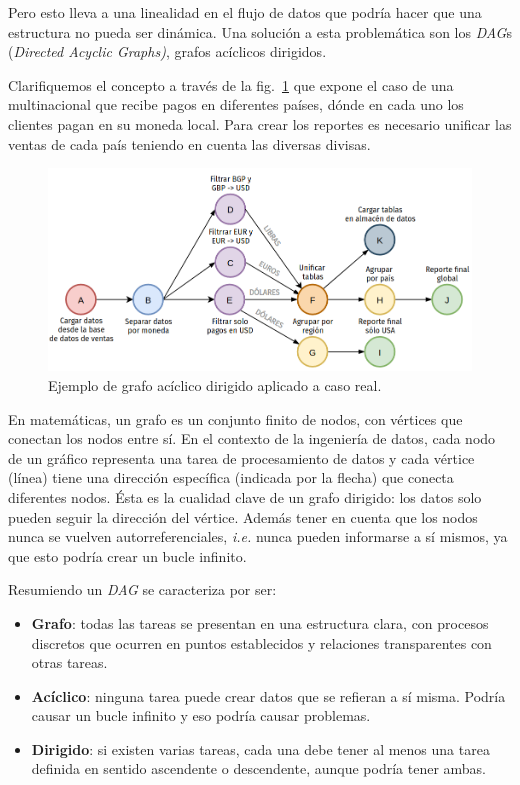 \documentclass[a4paper,12pt]{article}
\begin{document}
		Pero esto lleva a una linealidad en el flujo de datos que podría hacer que una estructura no pueda ser dinámica. Una solución a esta problemática son los \textit{DAG}s (\textit{Directed Acyclic Graphs)}, grafos acíclicos dirigidos.
				
		Clarifiquemos el concepto a través de la fig.~\ref{fig:dag} que expone el caso de una multinacional que recibe pagos en diferentes países, dónde en cada uno los clientes pagan en su moneda local. Para crear los reportes es necesario unificar las ventas de cada país teniendo en cuenta las diversas divisas.
				
		\begin{figure}[H]
			\begin{center}				
				\includegraphics[width=1\textwidth]{dag.png}
				\caption{Ejemplo de grafo acíclico dirigido aplicado a caso real.}
				\label{fig:dag}
			\end{center}
		\end{figure}
				
		En matemáticas, un grafo es un conjunto finito de nodos, con vértices que conectan los nodos entre sí. En el contexto de la ingeniería de datos, cada nodo de un gráfico representa una tarea de procesamiento de datos y cada vértice (línea) tiene una dirección específica (indicada por la flecha) que conecta diferentes nodos. Ésta es la cualidad clave de un grafo dirigido: los datos solo pueden seguir la dirección del vértice. Además tener en cuenta que los nodos nunca se vuelven autorreferenciales, \textit{i.e.} nunca pueden informarse a sí mismos, ya que esto podría crear un bucle infinito.
				
		Resumiendo un \textit{DAG} se caracteriza por ser:
		\begin{itemize}[noitemsep, topsep=2pt]
			\item \textbf{Grafo}: todas las tareas se presentan en una estructura clara, con procesos discretos que ocurren en puntos establecidos y relaciones transparentes con otras tareas.
			\item \textbf{Acíclico}: ninguna tarea puede crear datos que se refieran a sí misma. Podría causar un bucle infinito y eso podría causar problemas.
			\item \textbf{Dirigido}: si existen varias tareas, cada una debe tener al menos una tarea definida en sentido ascendente o descendente, aunque podría tener ambas.
		\end{itemize}
				
\end{document}
